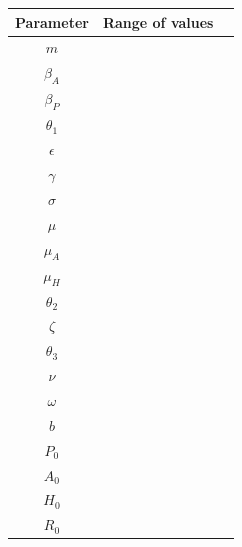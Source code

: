 \documentclass[12pt]{article}
\begin{document}
\begin{center}

\begin{tabular}{|c | c | c|}

 \hline

{Parameter} & {Range of values}  \\ [0.5ex]

 \hline\hline

$m$ &  \\

\hline

$\beta_A$&    \\

\hline

$\beta_P$&    \\

\hline

$\theta_1$&    \\

\hline 

$\epsilon$ &    \\

\hline

$\gamma$ &    \\

\hline


$\sigma$ &    \\

\hline

$\mu$&    \\

\hline

$\mu_A$&    \\

\hline

$\mu_H$&    \\

\hline

$\theta_2$&    \\

\hline

$\zeta$&    \\

\hline

$\theta_3$ &  \\

\hline

$\nu$ &   \\

\hline

$\omega$ &   \\

 \hline
 
 $b$ &   \\

 \hline
 
 $P_0$ &   \\

 \hline

$A_0$ &   \\

\hline
$H_0$ &   \\

 \hline
 $R_0$ &   \\


 \hline
\end{tabular}

\end{center}
\end{document}

